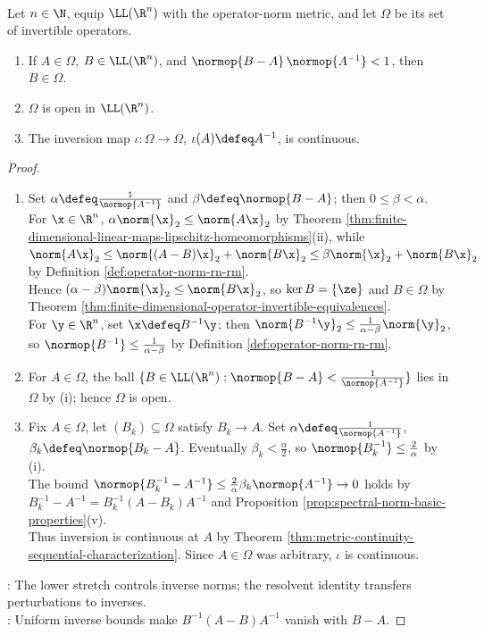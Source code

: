 \begin{theorem} \label{thm:invertible-operators-open-and-inversion-continuous} \\
Let $n\in\N$, equip $\LL(\R^n)$ with the operator-norm metric, and let $\Omega$ be its set of invertible operators.
\begin{enumerate}[label=(\roman*)]
\setlength{\itemsep}{0pt}
\item If $A\in\Omega$, $B\in\LL(\R^n)$, and $\normop{B-A}\,\normop{A^{-1}}<1$, then $B\in\Omega$.
\item $\Omega$ is open in $\LL(\R^n)$.
\item The inversion map $\iota:\Omega\to\Omega$, $\iota(A)\defeq A^{-1}$, is continuous.
\end{enumerate}
\begin{proof}
\begin{enumerate}[label=(\roman*)]
\setlength{\itemsep}{0pt}
\item Set $\alpha\defeq\frac{1}{\normop{A^{-1}}}$ and $\beta\defeq\normop{B-A}$; then $0\leq\beta<\alpha$.\\
For $\x\in\R^n$, $\alpha\norm{\x}_2\leq\norm{A\x}_2$ by Theorem \ref{thm:finite-dimensional-linear-maps-lipschitz-homeomorphisms}(ii), while $\norm{A\x}_2\leq\norm{(A-B)\x}_2+\norm{B\x}_2\leq\beta\norm{\x}_2+\norm{B\x}_2$ by Definition \ref{def:operator-norm-rn-rm}.\\
Hence $(\alpha-\beta)\norm{\x}_2\leq\norm{B\x}_2$, so $\ker B=\{\ze\}$ and $B\in\Omega$ by Theorem \ref{thm:finite-dimensional-operator-invertible-equivalences}.\\
For $\y\in\R^n$, set $\x\defeq B^{-1}\y$; then $\norm{B^{-1}\y}_2\leq\frac{1}{\alpha-\beta}\norm{\y}_2$, so $\normop{B^{-1}}\leq\frac{1}{\alpha-\beta}$ by Definition \ref{def:operator-norm-rn-rm}.
\item For $A\in\Omega$, the ball $\{B\in\LL(\R^n):\normop{B-A}<\frac{1}{\normop{A^{-1}}}\}$ lies in $\Omega$ by (i); hence $\Omega$ is open.
\item Fix $A\in\Omega$, let $(B_k)\subseteq\Omega$ satisfy $B_k\to A$. Set $\alpha\defeq\frac{1}{\normop{A^{-1}}}$, $\beta_k\defeq\normop{B_k-A}$. Eventually $\beta_k<\frac{\alpha}{2}$, so $\normop{B_k^{-1}}\leq\frac{2}{\alpha}$ by (i).\\
The bound $\normop{B_k^{-1}-A^{-1}}\leq\frac{2}{\alpha}\beta_k\normop{A^{-1}}\to0$ holds by $B_k^{-1}-A^{-1}=B_k^{-1}(A-B_k)A^{-1}$ and Proposition \ref{prop:spectral-norm-basic-properties}(v).\\
Thus inversion is continuous at $A$ by Theorem \ref{thm:metric-continuity-sequential-characterization}. Since $A\in\Omega$ was arbitrary, $\iota$ is continuous.
\end{enumerate}
: The lower stretch controls inverse norms; the resolvent identity transfers perturbations to inverses.\\
: Uniform inverse bounds make $B^{-1}(A-B)A^{-1}$ vanish with $B-A$.
\end{proof}
\end{theorem}


